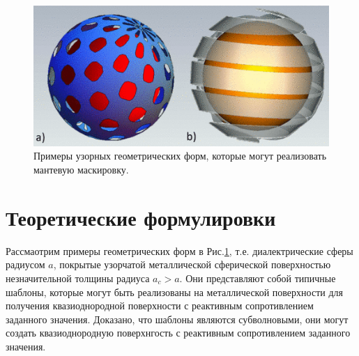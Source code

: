 \documentclass[12pt,a4paper]{article}
\begin{document}
\begin{figure}[t]
  \centering
  \includegraphics[height=0.15\paperheight]{1.png}
  \caption{Примеры узорных геометрических форм, которые могут реализовать мантевую маскировку.}
  \label{fig:1}
\end{figure}

\section{Теоретические формулировки}
Рассмаотрим примеры геометрических форм в Рис.\ref{fig:1}, т.е. диалектрические сферы радиусом $a$,
покрытые узорчатой металлической сферической поверхностью незначительной толщины радиуса $a_c > a$.
Они представляют собой типичные шаблоны, которые могут быть реализованы на металлической поверхности
для получения квазиоднородной поверхности с реактивным сопротивлением заданного значения. Доказано, что
шаблоны являются субволновыми, они могут создать квазиоднородную поверхнгость с реактивным сопротивлением
заданного значения.
\end{document}
